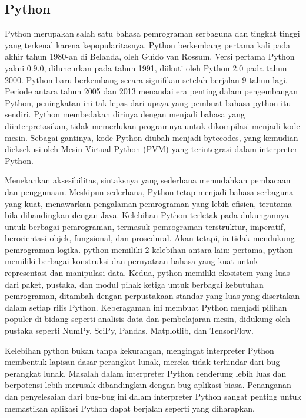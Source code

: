 \subsection{Python}
Python merupakan salah satu bahasa pemrograman serbaguna dan tingkat tinggi yang terkenal karena kepopularitasnya. Python berkembang pertama kali pada akhir tahun 1980-an di Belanda, oleh Guido van Rossum. Versi pertama Python yakni 0.9.0, diluncurkan pada tahun 1991, diikuti oleh Python 2.0 pada tahun 2000. Python baru berkembang secara signifikan setelah berjalan 9 tahun lagi. Periode antara tahun 2005 dan 2013 menandai era penting dalam pengembangan Python, peningkatan ini tak lepas dari upaya yang pembuat bahasa python itu sendiri. Python membedakan dirinya dengan menjadi bahasa yang diinterpretasikan, tidak memerlukan programnya untuk dikompilasi menjadi kode mesin. Sebagai gantinya, kode Python diubah menjadi bytecodes, yang kemudian dieksekusi oleh Mesin Virtual Python (PVM) yang terintegrasi dalam interpreter Python\parencite{Harris2023}.

Menekankan aksesibilitas, sintaksnya yang sederhana memudahkan pembacaan dan penggunaan. Meskipun sederhana, Python tetap menjadi bahasa serbaguna yang kuat, menawarkan pengalaman pemrograman yang lebih efisien, terutama bila dibandingkan dengan Java. Kelebihan Python terletak pada dukungannya untuk berbagai pemrograman, termasuk pemrograman terstruktur, imperatif, berorientasi objek, fungsional, dan prosedural. Akan tetapi, ia tidak mendukung pemrograman logika. python memiliki 2 kelebihan antara lain: pertama, python memiliki berbagai konstruksi dan pernyataan bahasa yang kuat untuk representasi dan manipulasi data. Kedua, python memiliki ekosistem yang luas dari paket, pustaka, dan modul pihak ketiga untuk berbagai kebutuhan pemrograman, ditambah dengan perpustakaan standar yang luas yang disertakan dalam setiap rilis Python. Keberagaman ini membuat Python menjadi pilihan populer di bidang seperti analisis data dan pembelajaran mesin, didukung oleh pustaka seperti NumPy, SciPy, Pandas, Matplotlib, dan TensorFlow\parencite{Harris2023}.

Kelebihan python bukan tanpa kekurangan, mengingat interpreter Python membentuk lapisan dasar perangkat lunak, mereka tidak terhindar dari bug perangkat lunak. Masalah dalam interpreter Python cenderung lebih luas dan berpotensi lebih merusak dibandingkan dengan bug aplikasi biasa. Penanganan dan penyelesaian dari bug-bug ini dalam interpreter Python sangat penting untuk memastikan aplikasi Python dapat berjalan seperti yang diharapkan\parencite{Ziyuan2022}.

